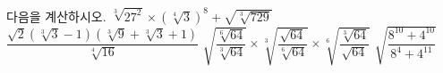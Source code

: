 다음을 계산하시오.
 $\sqrt[3]{27^2}\times(\sqrt[4]{3})^{8}+\sqrt{\sqrt[3]{729}}$
 $\dfrac{\sqrt{2}(\sqrt[3]{3}-1)(\sqrt[3]{9}+\sqrt[3]{3}+1)}{\sqrt[4]{16}}$
 $\sqrt{\dfrac{\sqrt[6]{64}}{\sqrt[3]{64}}}\times\sqrt[3]{\dfrac{\sqrt{64}}{\sqrt[6]{64}}}\times\sqrt[6]{\dfrac{\sqrt[3]{64}}{\sqrt{64}}}$
 $\sqrt{\dfrac{8^{10}+4^{10}}{8^{4}+4^{11}}}$
